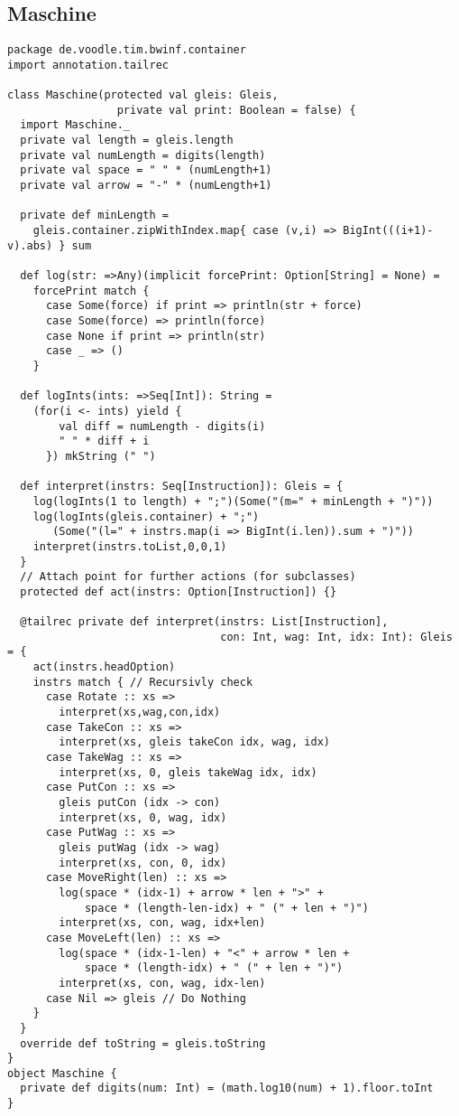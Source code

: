 \clearpage\subsection{Maschine}
\begin{lstlisting}
package de.voodle.tim.bwinf.container
import annotation.tailrec

class Maschine(protected val gleis: Gleis,
                 private val print: Boolean = false) {
  import Maschine._
  private val length = gleis.length
  private val numLength = digits(length)
  private val space = " " * (numLength+1)
  private val arrow = "-" * (numLength+1)

  private def minLength =
    gleis.container.zipWithIndex.map{ case (v,i) => BigInt(((i+1)-v).abs) } sum

  def log(str: =>Any)(implicit forcePrint: Option[String] = None) =
    forcePrint match {
      case Some(force) if print => println(str + force)
      case Some(force) => println(force)
      case None if print => println(str)
      case _ => ()
    }
  
  def logInts(ints: =>Seq[Int]): String =
    (for(i <- ints) yield {
        val diff = numLength - digits(i)
        " " * diff + i
      }) mkString (" ")

  def interpret(instrs: Seq[Instruction]): Gleis = {
    log(logInts(1 to length) + ";")(Some("(m=" + minLength + ")"))
    log(logInts(gleis.container) + ";")
       (Some("(l=" + instrs.map(i => BigInt(i.len)).sum + ")"))
    interpret(instrs.toList,0,0,1)
  }
  // Attach point for further actions (for subclasses)
  protected def act(instrs: Option[Instruction]) {}
  
  @tailrec private def interpret(instrs: List[Instruction],
                                 con: Int, wag: Int, idx: Int): Gleis = {
    act(instrs.headOption)
    instrs match { // Recursivly check
      case Rotate :: xs =>
        interpret(xs,wag,con,idx)
      case TakeCon :: xs =>
        interpret(xs, gleis takeCon idx, wag, idx)
      case TakeWag :: xs =>
        interpret(xs, 0, gleis takeWag idx, idx)
      case PutCon :: xs =>
        gleis putCon (idx -> con)
        interpret(xs, 0, wag, idx)
      case PutWag :: xs =>
        gleis putWag (idx -> wag)
        interpret(xs, con, 0, idx)
      case MoveRight(len) :: xs =>
        log(space * (idx-1) + arrow * len + ">" +
            space * (length-len-idx) + " (" + len + ")")
        interpret(xs, con, wag, idx+len)
      case MoveLeft(len) :: xs =>
        log(space * (idx-1-len) + "<" + arrow * len +
            space * (length-idx) + " (" + len + ")")
        interpret(xs, con, wag, idx-len)
      case Nil => gleis // Do Nothing
    }
  }
  override def toString = gleis.toString
}
object Maschine {
  private def digits(num: Int) = (math.log10(num) + 1).floor.toInt
}
\end{lstlisting}

